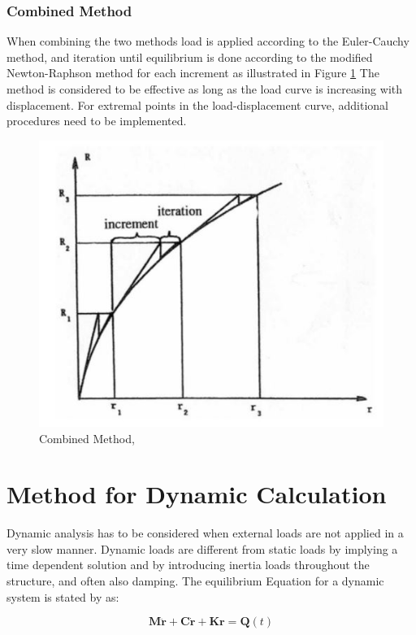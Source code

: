 \subsubsection{Combined Method}
\label{sec:combined}
When combining the two methods load is applied according to the Euler-Cauchy method, and iteration until equilibrium is done according to the modified Newton-Raphson method for each increment as illustrated in Figure \ref{fig:combined} The method is considered to be effective as long as the load curve is increasing with displacement. For extremal points in the load-displacement curve, additional procedures need to be implemented.    

 \begin{figure}[H]
\centering
\includegraphics[scale=0.8]{figures/combined}
\caption[$\; \:$Combined Method]{Combined Method, \cite{moan2003} }
 \label{fig:combined}
\end{figure}
\section{Method for Dynamic Calculation}
Dynamic analysis has to be considered when external loads are not applied in a very slow manner. Dynamic loads are different from static loads by implying a time dependent solution and by introducing inertia loads throughout the structure, and often also damping. The equilibrium Equation for a dynamic system is stated by \cite{Langen1999} as:

\begin{equation}
  \boldsymbol{M \ddot{r}} + \boldsymbol{C \dot{r}} + \boldsymbol{Kr} =  \boldsymbol{Q}(t)
  \label{eq:eq}
\end{equation}

